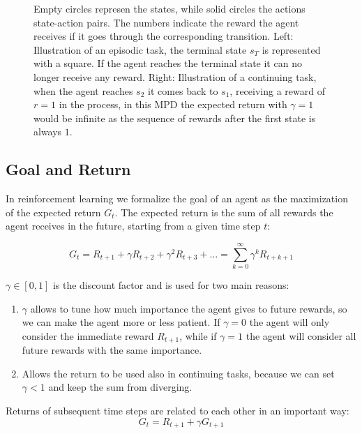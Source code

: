 \begin{figure}
    \centering
    
    \caption{Empty circles represen the states, while solid circles the actions state-action pairs. The numbers indicate the reward the agent receives if it goes through the corresponding transition. Left: Illustration of an episodic task, the terminal state $s_T$ is represented with a square. If the agent reaches the terminal state it can no longer receive any reward. Right: Illustration of a continuing task, when the agent reaches $s_2$ it comes back to $s_1$, receiving a reward of $r=1$ in the process, in this MPD the expected return with $\gamma = 1$ would be infinite as the sequence of rewards after the first state is always $1$.}
    \label{fig:episodic-continuing}
\end{figure}

\subsection{Goal and Return}
In reinforcement learning we formalize the goal of an agent as the maximization of the expected return $G_t$. The expected return is the sum of all rewards the agent receives in the future, starting from a given time step $t$:

\begin{equation}
    G_t = R_{t+1} + \gamma R_{t+2} + \gamma^2 R_{t+3} + \dots = \sum_{k=0}^{\infty} \gamma^k R_{t+k+1}
    \label{return}
\end{equation}

$\gamma \in [0, 1]$ is the discount factor and is used for two main reasons:
\begin{enumerate}
    \item $\gamma$ allows to tune how much importance the agent gives to future rewards, so we can make the agent more or less patient. If $\gamma = 0$ the agent will only consider the immediate reward $R_{t+1}$, while if $\gamma = 1$ the agent will consider all future rewards with the same importance.
    \item Allows the return to be used also in continuing tasks, because we can set $\gamma < 1$ and keep the sum from diverging.
\end{enumerate}
Returns of subsequent time steps are related to each other in an important way:
\begin{equation}
    G_t = R_{t+1} + \gamma G_{t+1}
    \label{return-recursive}
\end{equation}

